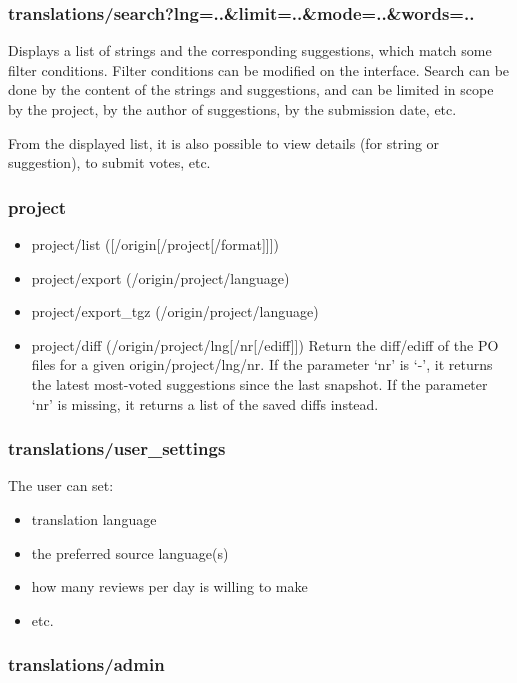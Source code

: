 \documentclass[11pt]{article}
\begin{document}
\subsubsection{translations/search?lng=..\&limit=..\&mode=..\&words=..}
\label{sec-8.3.2}


    Displays a list of strings and the corresponding suggestions, which
    match some filter conditions. Filter conditions can be modified on
    the interface. Search can be done by the content of the strings and
    suggestions, and can be limited in scope by the project, by the author
    of suggestions, by the submission date, etc.

    From the displayed list, it is also possible to view details (for
    string or suggestion), to submit votes, etc.


\subsubsection{project}
\label{sec-8.3.3}

\begin{itemize}
\item project/list ([/origin[/project[/format]]])
\item project/export (/origin/project/language)
\item project/export\_{}tgz (/origin/project/language)
\item project/diff (/origin/project/lng[/nr[/ediff]])
      Return the diff/ediff of the PO files for a given
      origin/project/lng/nr.  If the parameter `nr' is `-', it returns
      the latest most-voted suggestions since the last snapshot.  If
      the parameter `nr' is missing, it returns a list of the saved
      diffs instead.
\end{itemize}
\subsubsection{translations/user\_{}settings}
\label{sec-8.3.4}

    The user can set:
\begin{itemize}
\item translation language
\item the preferred source language(s)
\item how many reviews per day is willing to make
\item etc.
\end{itemize}
\subsubsection{translations/admin}
\label{sec-8.3.5}
\end{document}
